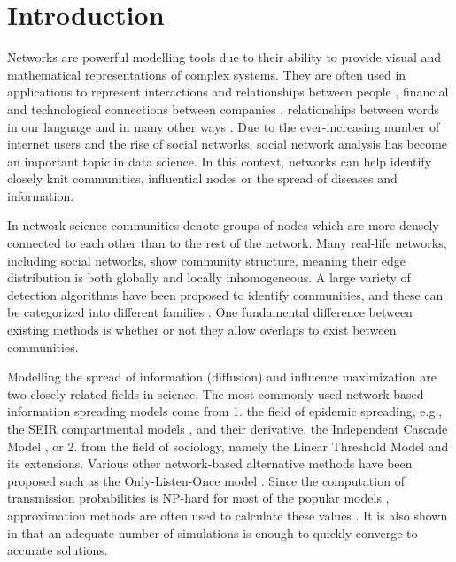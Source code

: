 \documentclass[pdflatex,sn-mathphys-ay]{sn-jnl}
\begin{document}


\maketitle

\newpage


\section{Introduction}\label{sec_introduction}

Networks are powerful modelling tools due to their ability to provide visual and mathematical representations of complex systems. They are often used in applications to represent interactions and relationships between people \citep{social}, financial and technological connections between companies \citep{fraud}, relationships between words in our language \citep{words} and in many other ways \citep{newmanreview}. Due to the ever-increasing number of internet users and the rise of social networks, social network analysis has become an important topic in data science. In this context, networks can help identify closely knit communities, influential nodes or the spread of diseases and information.

In network science communities denote groups of nodes which are more densely connected to each other than to the rest of the network. Many real-life networks, including social networks, show community structure, meaning their edge distribution is both globally and locally inhomogeneous. A large variety of detection algorithms have been proposed to identify communities, and these can be categorized into different families \citep{fortunatoreview}. One fundamental difference between existing methods is whether or not they allow overlaps to exist between communities.

Modelling the spread of information (diffusion) and influence maximization are two closely related fields in science. The most commonly used network-based information spreading models come from 1. the field of epidemic spreading, e.g., the SEIR compartmental models \citep{seir1927, seir2001}, and their derivative, the Independent Cascade Model \citep{domingos, kempe}, or 2. from the field of sociology, namely the Linear Threshold Model \citep{granovetter, kempe} and its extensions. Various other network-based alternative methods have been proposed such as the Only-Listen-Once model \citep{kempe}. Since the computation of transmission probabilities is NP-hard for most of the popular models \citep{kempe, economic}, approximation methods are often used to calculate these values \citep{lisurvey}. It is also shown in \citep{wasserman, kempe} that an adequate number of simulations is enough to quickly converge to accurate solutions.
\end{document}
